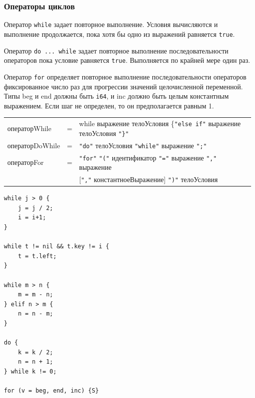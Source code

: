 \documentclass[a4paper,12pt]{article}
\newcommand{\lit}[1]{\texttt{"#1"}}
\begin{document}
    \subsubsection*{Операторы циклов}

    Оператор \texttt{while} задает повторное выполнение. Условия вычисляются и выполнение продолжается, пока хотя бы одно из выражений равняется \texttt{true}.

    Оператор \texttt{do ... while} задает повторное выполнение последовательности операторов пока условие равняется \texttt{true}. Выполняется по крайней мере один раз.

    Оператор \texttt{for} определяет повторное выполнение последовательности операторов фиксированное число раз для прогрессии значений целочисленной переменной. Типы beg и end должны быть \texttt{i64}, и inc должно быть целым константным выражением. Если шаг не определен, то он предполагается равным 1.

    \begin{center}
        \begin{tabular}{l c l}
            операторWhile & = & while выражение телоУсловия \{\lit{else if} выражение телоУсловия \lit{\}} \\
            операторDoWhile & = & \lit{do} телоУсловия \lit{while} выражение \lit{;} \\
            операторFor & = & \lit{for} \lit{(} идентификатор \lit{=} выражение \lit{,} выражение \\
            & & [\lit{,} константноеВыражение] \lit{)} телоУсловия
        \end{tabular}
    \end{center}

    \begin{center}
        \begin{minipage}[t]{0.5\textwidth}
            \begin{lstlisting}[style=obouldstyle]
while j > 0 {
    j = j / 2;
    i = i+1;
}

while t != nil && t.key != i {
    t = t.left;
}

while m > n {
    m = m - n;
} elif n > m {
    n = n - m;
}

do {
    k = k / 2;
    n = n + 1;
} while k != 0;

for (v = beg, end, inc) {S}

            \end{lstlisting}
        \end{minipage}
    \end{center}
\end{document}
